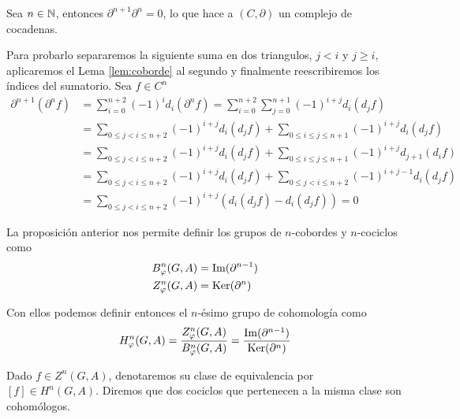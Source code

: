\begin{teorema}\label{prop:cochaincomplex}
	Sea $n\in \mathbb{N}$, entonces $\partial^{n+1}\partial^n = 0$, lo que hace a
	$(C,\partial)$ un complejo de cocadenas.
	\begin{demostracion}
		
		Para probarlo separaremos la siguiente suma en dos triangulos,  $j<i$ y $j\geq i$, aplicaremos el Lema \ref{lem:coborde} al segundo y finalmente reescribiremos los índices del sumatorio. 
		Sea $f\in C^n$ %
		\begin{align*}
		\partial^{n+1}(\partial^{n} f) 
			&= \sum_{i=0}^{n+2} (-1)^i d_i(\partial^n f) = \sum_{i=0}^{n+2}\sum_{j=0}^{n+1} (-1)^{i+j} d_i(d_jf)\\
			&= \sum_{0\leq j < i \leq n+2} (-1)^{i+j} d_i(d_jf)  + \sum_{0\leq i \leq j \leq n+1} (-1)^{i+j} d_i(d_jf)\\
			&= \sum_{0\leq j < i \leq n+2} (-1)^{i+j} d_i(d_jf)  + \sum_{0\leq i \leq j \leq n+1} (-1)^{i+j} d_{j+1}(d_if) \\
			&= \sum_{0\leq j < i \leq n+2} (-1)^{i+j} d_i(d_jf)  + \sum_{0\leq j < i \leq n+2} (-1)^{i+j-1} d_{i}(d_jf) \\
			&= \sum_{0\leq j < i \leq n+2} (-1)^{i+j}(d_i(d_jf)-d_i(d_jf)) = 0
		\end{align*}
	\end{demostracion}
\end{teorema}

\begin{definicion}
	La proposición anterior nos permite definir los grupos de $n$-cobordes y $n$-cociclos como 
	\begin{align*}
		B^n_\varphi(G,A) &= \operatorname{Im}(\partial^{n-1}) \\
		Z^n_\varphi(G,A) &= \operatorname{Ker}(\partial^{n})
	\end{align*}
	
	Con ellos podemos definir entonces el $n$-ésimo grupo de cohomología como 
	\begin{equation}
		H^n_\varphi(G,A) = \frac{Z^n_\varphi(G,A)}{B^n_\varphi(G,A)} = \frac{\operatorname{Im}(\partial^{n-1})}{\operatorname{Ker}(\partial^{n})}
	\end{equation}
	
	Dado $f\in Z^n(G,A)$, denotaremos su clase de equivalencia por $[f]\in H^n(G,A)$. Diremos que dos cociclos que pertenecen a la misma clase son cohomólogos. 
\end{definicion}

